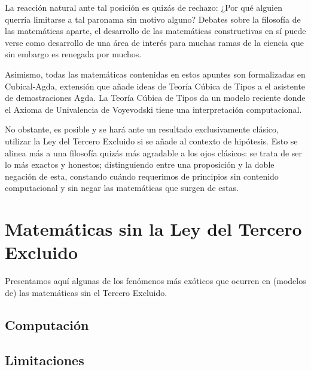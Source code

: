 La reacción natural ante tal posición es quizás de rechazo: ¿Por qué alguien querría limitarse a tal paronama sin motivo alguno? Debates sobre la filosofía de las matemáticas aparte, el desarrollo de las matemáticas constructivas en sí puede verse como desarrollo
de una área de interés para muchas ramas de la ciencia que sin embargo es renegada por muchos.

Asimismo, todas las matemáticas contenidas en estos apuntes son formalizadas en Cubical-Agda, extensión que añade ideas de Teoría Cúbica de Tipos a el asistente de demostraciones Agda. La Teoría Cúbica de Tipos da un modelo reciente donde el Axioma de Univalencia de
Voyevodski tiene una interpretación computacional.

No obstante, es posible y se hará ante un resultado exclusivamente clásico, utilizar la Ley del Tercero Excluido si se añade al contexto de hipótesis. Esto se alinea más a una filosofía quizás más agradable a los ojos clásicos: se trata de ser lo más exactos
y honestos; distinguiendo entre una proposición y la doble negación de esta, constando cuándo requerimos de principios sin contenido computacional y sin negar las matemáticas que surgen de estas.

\section{Matemáticas sin la Ley del Tercero Excluido}

Presentamos aquí algunas de los fenómenos más exóticos que ocurren en (modelos de) las matemáticas sin el Tercero Excluido.

\subsection{Computación}

\subsection{Limitaciones}
